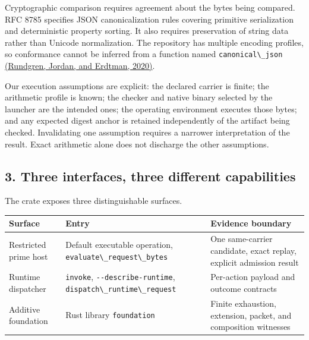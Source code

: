 \documentclass[
  11pt,
]{article}
\newcommand{\passthrough}[1]{#1}
\begin{document}
Cryptographic comparison requires agreement about the bytes being
compared. RFC 8785 specifies JSON canonicalization rules covering
primitive serialization and deterministic property sorting. It also
requires preservation of string data rather than Unicode normalization.
The repository has multiple encoding profiles, so conformance cannot be
inferred from a function named \passthrough{\lstinline!canonical\_json!}
\href{https://doi.org/10.17487/RFC8785}{(Rundgren, Jordan, and Erdtman,
2020)}.

Our execution assumptions are explicit: the declared carrier is finite;
the arithmetic profile is known; the checker and native binary selected
by the launcher are the intended ones; the operating environment
executes those bytes; and any expected digest anchor is retained
independently of the artifact being checked. Invalidating one assumption
requires a narrower interpretation of the result. Exact arithmetic alone
does not discharge the other assumptions.

\subsection{3. Three interfaces, three different
capabilities}\label{three-interfaces-three-different-capabilities}

The crate exposes three distinguishable surfaces.

\begin{longtable}[]{@{}
  >{\raggedright\arraybackslash}p{}
  >{\raggedright\arraybackslash}p{}
  >{\raggedright\arraybackslash}p{}@{}}
\toprule\noalign{}
\begin{minipage}[b]{\linewidth}\raggedright
Surface
\end{minipage} & \begin{minipage}[b]{\linewidth}\raggedright
Entry
\end{minipage} & \begin{minipage}[b]{\linewidth}\raggedright
Evidence boundary
\end{minipage} \\
\midrule\noalign{}
\endhead
\bottomrule\noalign{}
\endlastfoot
Restricted prime host & Default executable operation,
\passthrough{\lstinline!evaluate\_request\_bytes!} & One same-carrier
candidate, exact replay, explicit admission result \\
Runtime dispatcher & \passthrough{\lstinline!invoke!},
\passthrough{\lstinline!--describe-runtime!},
\passthrough{\lstinline!dispatch\_runtime\_request!} & Per-action
payload and outcome contracts \\
Additive foundation & Rust library \passthrough{\lstinline!foundation!}
& Finite exhaustion, extension, packet, and composition witnesses \\
\end{longtable}
\end{document}
